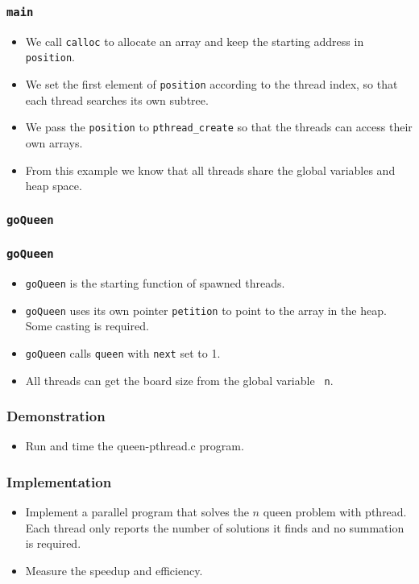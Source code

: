 \documentclass{beamer}
\begin{document}
\begin{frame}
\frametitle{\tt main}
\begin{itemize}
\item We call {\tt calloc} to allocate an array and keep the starting
  address in {\tt position}.
\item We set the first element of {\tt position} according to the
  thread index, so that each thread searches its own subtree.
\item We pass the {\tt position} to {\tt pthread\_create} so that the
  threads can access their own arrays.
\item From this example we know that all threads share the global
  variables and heap space.
\end{itemize}
\end{frame}

\begin{frame}
\frametitle{\tt goQueen}
\end{frame}

\begin{frame}
\frametitle{\tt goQueen}
\begin{itemize}
\item {\tt goQueen} is the starting function of spawned threads.
\item {\tt goQueen} uses its own pointer {\tt petition} to point to
  the array in the heap.  Some casting is required.
\item {\tt goQueen} calls {\tt queen} with {\tt next} set to 1.
\item All threads can get the board size from the global variable {\tt
  n}.
\end{itemize}
\end{frame}

\begin{frame}
\frametitle{Demonstration}
\begin{itemize}
\item Run and time the queen-pthread.c program.
\end{itemize}
\end{frame}

\begin{frame}
\frametitle{Implementation}
\begin{itemize}
\item Implement a parallel program that solves the $n$ queen problem
  with pthread.  Each thread only reports the number of solutions it
  finds and no summation is required.
\item Measure the speedup and efficiency.
\end{itemize}
\end{frame}
\end{document}
